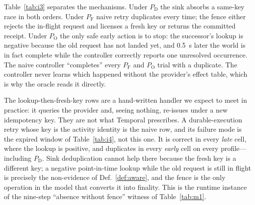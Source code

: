 \documentclass[conference,10pt]{IEEEtran}
\newcommand{\PD}{P_{\mathrm{D}}}
\newcommand{\PF}{P_{\mathrm{F}}}
\newcommand{\PO}{P_{\mathrm{O}}}
\begin{document}
Table~\ref{tab:i3} separates the mechanisms. Under $\PD$ the sink absorbs a same-key race in both orders. Under $\PF$ naive retry duplicates every time; the fence either rejects the in-flight request and licenses a fresh key or returns the committed receipt. Under $\PO$ the only safe early action is to stop: the successor's lookup is negative because the old request has not landed yet, and 0.5~s later the world is in fact complete while the controller correctly reports one unresolved occurrence. The naive controller ``completes'' every $\PF$ and $\PO$ trial with a duplicate. The controller never learns which happened without the provider's effect table, which is why the oracle reads it directly.

The lookup-then-fresh-key rows are a hand-written handler we expect to meet in practice: it queries the provider and, seeing nothing, re-issues under a new idempotency key. They are not what Temporal prescribes. A durable-execution retry whose key is the activity identity is the naive row, and its failure mode is the expired window of Table~\ref{tab:i4}, not this one. It is correct in every \emph{late} cell, where the lookup is positive, and duplicates in every \emph{early} cell on every profile---including $\PD$. Sink deduplication cannot help there because the fresh key is a different key; a negative point-in-time lookup while the old request is still in flight is precisely the non-evidence of Def.~\ref{def:aware}, and the fence is the only operation in the model that converts it into finality. This is the runtime instance of the nine-step ``absence without fence'' witness of Table~\ref{tab:m1}.
\end{document}
